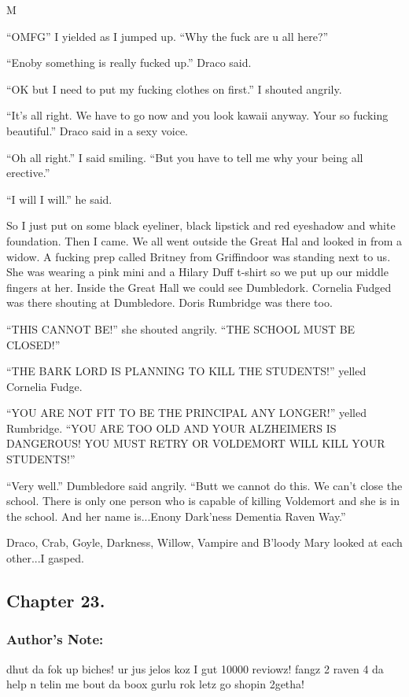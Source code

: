 M\documentclass{article}
\begin{document}
“OMFG” I yielded as I jumped up. “Why the fuck are u all here?”

“Enoby something is really fucked up.” Draco said.

“OK but I need to put my fucking clothes on first.” I shouted angrily.

“It’s all right. We have to go now and you look kawaii anyway. Your so fucking beautiful.” Draco said in a sexy voice.

“Oh all right.” I said smiling. “But you have to tell me why your being all erective.”

“I will I will.” he said.

So I just put on some black eyeliner, black lipstick and red eyeshadow and white foundation. Then I came. We all went outside the Great Hal and looked in from a widow. A fucking prep called Britney from Griffindoor was standing next to us. She was wearing a pink mini and a Hilary Duff t-shirt so we put up our middle fingers at her. Inside the Great Hall we could see Dumbledork. Cornelia Fudged was there shouting at Dumbledore. Doris Rumbridge was there too.

“THIS CANNOT BE!” she shouted angrily. “THE SCHOOL MUST BE CLOSED!”

“THE BARK LORD IS PLANNING TO KILL THE STUDENTS!” yelled Cornelia Fudge.

“YOU ARE NOT FIT TO BE THE PRINCIPAL ANY LONGER!” yelled Rumbridge. “YOU ARE TOO OLD AND YOUR ALZHEIMERS IS DANGEROUS! YOU MUST RETRY OR VOLDEMORT WILL KILL YOUR STUDENTS!”

“Very well.” Dumbledore said angrily. “Butt we cannot do this. We can’t close the school. There is only one person who is capable of killing Voldemort and she is in the school. And her name is...Enony Dark’ness Dementia Raven Way.”

Draco, Crab, Goyle, Darkness, Willow, Vampire and B’loody Mary looked at each other...I gasped.

\clearpage\nolinenumbers
\subsection*{Chapter 23.}

\subsubsection*{Author's Note: }dhut da fok up biches! ur jus jelos koz I gut 10000 reviowz! fangz 2 raven 4 da help n telin me bout da boox gurlu rok letz go shopin 2getha!
\end{document}
